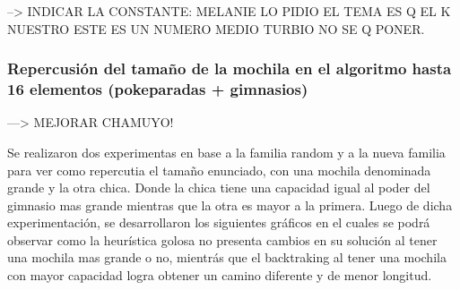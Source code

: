 --> INDICAR LA CONSTANTE: MELANIE LO PIDIO EL TEMA ES Q EL K NUESTRO ESTE ES UN NUMERO MEDIO TURBIO NO SE Q PONER.

\subsubsection*{Repercusi\'on del tamaño de la mochila en el algoritmo hasta 16 elementos (pokeparadas + gimnasios)}


---> MEJORAR CHAMUYO!

Se realizaron dos experimentas en base a la familia random y a la nueva familia para ver como repercutia el tamaño enunciado, con una mochila denominada grande y la otra chica. Donde la chica tiene una capacidad igual al poder del gimnasio mas grande mientras que la otra es mayor a la primera. Luego de dicha experimentación, se desarrollaron los siguientes gr\'aficos en el cuales se podr\'a observar como la heur\'istica golosa no presenta cambios en su soluci\'on al tener una mochila mas grande o no, mientr\'as que el backtraking al tener una mochila con mayor capacidad logra obtener un camino diferente y de menor longitud.\\

